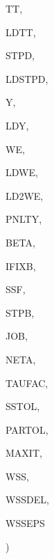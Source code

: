 {\begin{DoxyParamCaption}
\item[{double {\bf precision}, dimension(ldtt,{\bf m})}]{T\+T, }
\item[{integer}]{L\+D\+T\+T, }
\item[{double {\bf precision}, dimension(ldstpd,{\bf m})}]{S\+T\+P\+D, }
\item[{integer}]{L\+D\+S\+T\+P\+D, }
\item[{double {\bf precision}, dimension(ldy,nq)}]{Y, }
\item[{integer}]{L\+D\+Y, }
\item[{double {\bf precision}, dimension(ldwe,ld2we,nq)}]{W\+E, }
\item[{integer}]{L\+D\+W\+E, }
\item[{integer}]{L\+D2\+W\+E, }
\item[{double {\bf precision}}]{P\+N\+L\+T\+Y, }
\item[{double {\bf precision}, dimension(np)}]{B\+E\+T\+A, }
\item[{integer, dimension(np)}]{I\+F\+I\+X\+B, }
\item[{double {\bf precision}, dimension(np)}]{S\+S\+F, }
\item[{double {\bf precision}, dimension(np)}]{S\+T\+P\+B, }
\item[{integer}]{J\+O\+B, }
\item[{integer}]{N\+E\+T\+A, }
\item[{double {\bf precision}}]{T\+A\+U\+F\+A\+C, }
\item[{double {\bf precision}}]{S\+S\+T\+O\+L, }
\item[{double {\bf precision}}]{P\+A\+R\+T\+O\+L, }
\item[{integer}]{M\+A\+X\+I\+T, }
\item[{double {\bf precision}}]{W\+S\+S, }
\item[{double {\bf precision}}]{W\+S\+S\+D\+E\+L, }
\item[{double {\bf precision}}]{W\+S\+S\+E\+P\+S}
\end{DoxyParamCaption}
)}\label{d__odr_8f_aa6a2207571a23b36dff6c649403352ed}
\hypertarget{d__odr_8f_ae9fe73f17d2723ba42ebeffb34cd0b5e}{}
